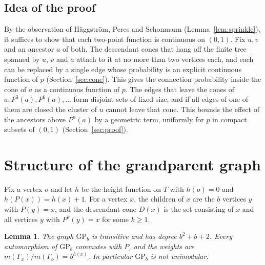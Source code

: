 \documentclass[11pt]{amsart}
\newtheorem{lemma}[theorem]{Lemma}
\theoremstyle{remark}
\newcommand{\GP}{\mathrm{GP}_b}
\begin{document}
\subsection{Idea of the proof}
By the observation of Häggström, Peres and Schonmann (Lemma~\ref{lem:sprinkle}), it suffices to show that each two-point
function is continuous on $(0,1)$. Fix $u,v$ and an ancestor $a$ of both. The descendant cones that hang off the finite
tree spanned by $u$, $v$ and $a$ attach to it at no more than two vertices each, and each can be replaced by a single edge
whose probability is an explicit continuous function of $p$ (Section~\ref{sec:cone}). This gives the connection
probability inside the cone of $a$ as a continuous function of $p$. The edges that leave the cones of $a,P^3(a),P^6(a),
\dots$ form disjoint sets of fixed size, and if all edges of one of them are closed the cluster of $u$ cannot leave that
cone. This bounds the effect of the ancestors above $P^n(a)$ by a geometric term, uniformly for $p$ in compact subsets of
$(0,1)$ (Section~\ref{sec:proof}).

\section{Structure of the grandparent graph}\label{sec:structure}

Fix a vertex $o$ and let $h$ be the height function on $T$ with $h(o)=0$ and $h(P(x))=h(x)+1$. For a vertex $x$, the
children of $x$ are the $b$ vertices $y$ with $P(y)=x$, and the descendant cone $D(x)$ is the set consisting of $x$ and
all vertices $y$ with $P^k(y)=x$ for some $k\ge1$.

\begin{lemma}\label{lem:structure}
The graph $\GP$ is transitive and has degree $b^2+b+2$. Every automorphism of $\GP$ commutes with $P$, and the weights
are $m(\Gamma_x)/m(\Gamma_o)=b^{h(x)}$. In particular $\GP$ is not unimodular.
\end{lemma}
\end{document}
